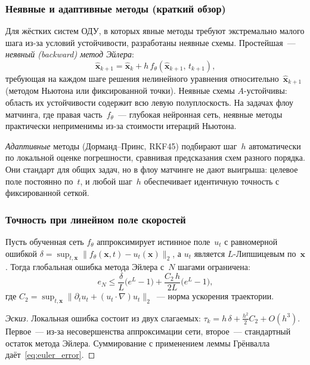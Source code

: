 \subsubsection{Неявные и адаптивные методы (краткий обзор)}

Для жёстких систем ОДУ, в которых явные методы требуют экстремально малого шага из-за условий устойчивости, разработаны неявные схемы. Простейшая~--- \emph{неявный (backward) метод Эйлера}:
\[
    \hat{\mathbf{x}}_{k+1} = \hat{\mathbf{x}}_k + h\,f_\theta(\hat{\mathbf{x}}_{k+1},\,t_{k+1}),
\]
требующая на каждом шаге решения нелинейного уравнения относительно~$\hat{\mathbf{x}}_{k+1}$ (методом Ньютона или фиксированной точки). Неявные схемы $A$-устойчивы: область их устойчивости содержит всю левую полуплоскость. На задачах флоу матчинга, где правая часть~$f_\theta$~--- глубокая нейронная сеть, неявные методы практически неприменимы из-за стоимости итераций Ньютона.

\emph{Адаптивные} методы (Дорманд--Принс, RKF45) подбирают шаг~$h$ автоматически по локальной оценке погрешности, сравнивая предсказания схем разного порядка. Они стандарт для общих задач, но в флоу матчинге не дают выигрыша: целевое поле постоянно по~$t$, и любой шаг~$h$ обеспечивает идентичную точность с фиксированной сеткой.

\subsubsection{Точность при линейном поле скоростей}

\begin{proposition}
\label{prop:euler_mfm}
Пусть обученная сеть $f_\theta$ аппроксимирует истинное поле~$u_t$ с равномерной ошибкой $\delta = \sup_{t,\mathbf{x}} \lVert f_\theta(\mathbf{x},t) - u_t(\mathbf{x})\rVert_2$, а $u_t$ является $L$-Липшицевым по~$\mathbf{x}$. Тогда глобальная ошибка метода Эйлера с~$N$ шагами ограничена:
\begin{equation}
    e_N \leq \frac{\delta}{L}\bigl(e^{L}-1\bigr) + \frac{C_2\,h}{2L}\bigl(e^L-1\bigr),
    \label{eq:euler_error}
\end{equation}
где $C_2 = \sup_{t,\mathbf{x}} \lVert\partial_t u_t + (u_t\cdot\nabla)u_t\rVert_2$~--- норма ускорения траектории.
\end{proposition}

\begin{proof}[Эскиз]
Локальная ошибка состоит из двух слагаемых: $\tau_k = h\,\delta + \tfrac{h^2}{2}C_2 + O(h^3)$. Первое~--- из-за несовершенства аппроксимации сети, второе~--- стандартный остаток метода Эйлера. Суммирование с применением леммы Грёнвалла даёт~\eqref{eq:euler_error}.
\end{proof}

